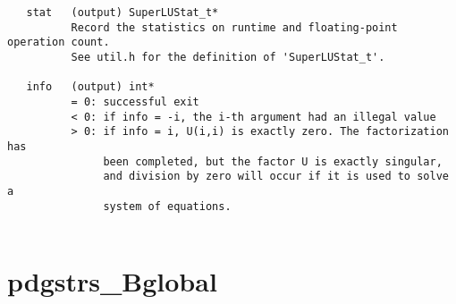 \begin{verbatim}
   stat   (output) SuperLUStat_t*
          Record the statistics on runtime and floating-point operation count.
          See util.h for the definition of 'SuperLUStat_t'.
  
   info   (output) int*
          = 0: successful exit
          < 0: if info = -i, the i-th argument had an illegal value
          > 0: if info = i, U(i,i) is exactly zero. The factorization has
               been completed, but the factor U is exactly singular,
               and division by zero will occur if it is used to solve a
               system of equations.
  
\end{verbatim}

\section{pdgstrs\_Bglobal}
